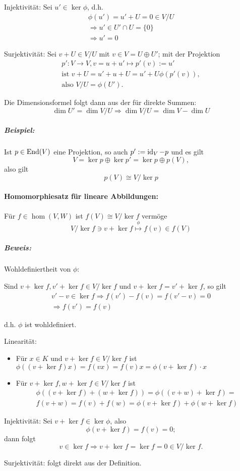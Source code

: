 	Injektivität: Sei $ u'\in \ker \phi $, d.h.
		\begin{gather*}
		\phi(u')=u'+U=0\in V/U\\
		\Rightarrow u'\in U'\cap U = \{0\}\\
		\Rightarrow u'=0
		\end{gather*}
		
	Surjektivität: Sei $ v+U\in V/U $ mit $ v\in V = U \oplus U' $; mit der Projektion
	\begin{gather*}
		p':V\to V, v=u+u' \mapsto p'(v) := u'\\
		\text{ist } v + U = u' + u + U = u' + U \phi(p'(v)),\\
		\text{also }V/U = \phi(U').
	\end{gather*}
	
	Die Dimensionsformel folgt dann aus der für direkte Summen:
		\[ \dim U' = \dim V/U \Rightarrow \dim V/U = \dim V-\dim U \]
		
\subparagraph{Beispiel: }
	Ist $ p\in \operatorname{End}(V) $ eine Projektion, so auch $ p':= \operatorname{id}_V-p $ und es gilt
		\[ V= \ker p \oplus \ker p' = \ker p \oplus p(V), \]
	also gilt
		\[ p(V)\cong V/\ker p \]

\paragraph{Homomorphiesatz für lineare Abbildungen: }
	Für $ f\in \hom(V,W) $ ist $ f(V)\cong V/\ker f $ vermöge
		\[ V/\ker f\ni v+\ker f \overset{\phi}{\mapsto} f(v)\in f(V) \]

\subparagraph{Beweis: }
	Wohldefiniertheit von $ \phi $: 
	
	Sind $ v+\ker f, v'+\ker f \in V/\ker f$ und $ v+\ker f = v'+\ker f $, so gilt 
		\begin{gather*}
		v'-v \in \ker f \Rightarrow f(v')-f(v) = f(v'-v) = 0 \\
			\Rightarrow f(v') = f(v)
		\end{gather*}
	
	d.h. $ \phi $ ist wohldefiniert.
	
	Linearität:
		\begin{itemize}
		\item Für $ x\in K $ und $ v+\ker f \in V/\ker f $ ist $ \phi( (v+\ker f)x) =f(vx) = f(v)x = \phi (v+\ker f)\cdot x $
		\item Für $ v+\ker f, w+\ker f\in V/\ker f $ ist 
			\begin{gather*}
			\phi ((v+\ker f)+(w+\ker f) ) = \phi((v+w)+\ker f) =\\
			f(v+w) = f(v)+f(w)=\phi(v+\ker f)+\phi(w+\ker f)
			\end{gather*}
		\end{itemize}
	
	Injektivität:
	Sei $ v+\ker f\in \ker \phi $, also 
		\[ \phi(v+\ker f)= f(v) = 0; \]
	dann folgt
		\[ v\in \ker f \Rightarrow v+\ker f = \ker f = 0\in V/\ker f. \]
	
	Surjektivität:
	folgt direkt aus der Definition.		